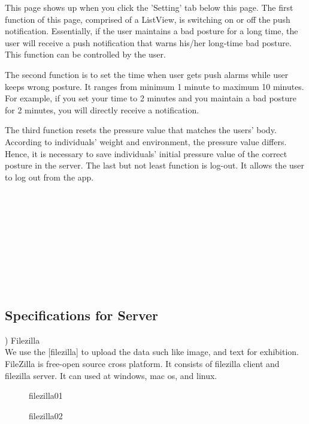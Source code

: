 \documentclass[conference]{IEEEtran}
\begin{document}
This page shows up when you click the 'Setting' tab below this page. The first function of this page, comprised of a ListView, is switching on or off the push notification. Essentially, if the user maintains a bad posture for a long time, the user will receive a push notification that warns his/her long-time bad posture. This function can be controlled by the user. 

The second function is to set the time when user gets push alarms while user keeps wrong posture. It ranges from minimum 1 minute to maximum 10 minutes. For example, if you set your time to 2 minutes and you maintain a bad posture for 2 minutes, you will directly receive a notification.

The third function resets the pressure value that matches the users' body. According to individuals' weight and environment, the pressure value differs. Hence, it is necessary to save individuals' initial pressure value of the  correct posture in the server. The last but not least function is log-out. It allows the user to log out from the app.\\\\\\\\\\\\\\\\\\\\





\subsection{Specifications for Server}

) Filezilla \\
We use the [filezilla] to upload the data such like image, and text for exhibition. FileZilla is free-open source cross platform. It consists of filezilla client and filezilla server. It can used at windows, mac os, and linux. \\


\begin{figure}[htbp]
\begin{center}
    \caption{filezilla01} 
\end{center}
\end{figure}


\begin{figure}[htbp]
\begin{center}
    \caption{filezilla02} 
\end{center}
\end{figure}
\end{document}
